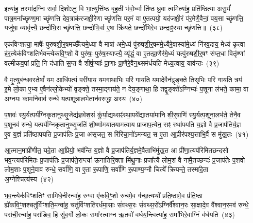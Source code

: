 इत्या॑ह॒ तस्मा॑द॒ग्निः सर्वा॒ दिशो\-ऽनु॒ वि भा॒त्युत्ति॑ष्ठ बृह॒ती भ॑वो॒र्ध्वा ति॑ष्ठ ध्रु॒वा त्वमित्या॑ह॒ प्रति॑ष्ठित्या असु॒र्यं॑ पात्र॒\-मना᳚च्छृण्ण॒मा च्छृ॑णत्ति देव॒त्राक॑रजक्षी॒रेणा च्छृ॑णत्ति पर॒मं वा ए॒तत्पयो॒ यद॑जक्षी॒रं प॑र॒मेणै॒वैनां॒ पय॒सा च्छृ॑णत्ति॒ यजु॑षा॒ व्यावृ॑त्त्यै॒ छन्दो॑भि॒रा च्छृ॑णत्ति॒ छन्दो॑भि॒र्वा ए॒षा क्रि॑यते॒ छन्दो॑भिरे॒व छन्दा॒ꣴ॒स्या च्छृ॑णत्ति॥~(३८)

{\anuvakamend[{आ॒ह॒ दे॒वानां॒ वै पत्नीः᳚ पृणै॒षा षट्च॑}]}%

एक॑विꣳशत्या॒ माषैः᳚ पुरुषशी॒र्॒\mbox{}षमच्छै᳚त्यमे॒ध्या वै माषा॑ अमे॒ध्यं पु॑रुषशी॒र्॒\mbox{}षम॑मे॒ध्यैरे॒वास्या॑मे॒ध्यं नि॑रव॒दाय॒ मेध्यं॑ कृ॒त्वा ह॑र॒त्येक॑विꣳशतिर्भवन्त्येकवि॒ꣳ॒शो वै पुरु॑षः॒ पुरु॑ष॒स्याप्त्यै॒ व्यृ॑द्धं॒ वा ए॒तत्प्रा॒णैर॑मे॒ध्यं यत्पु॑रुषशी॒र्॒\mbox{}षꣳ स॑प्त॒धा वितृ॑ण्णां वल्मीकव॒पां प्रति॒ नि द॑धाति स॒प्त वै शी॑र्\mbox{}ष॒ण्याः᳚ प्रा॒णाः प्रा॒णैरे॒वैन॒थ्सम॑र्धयति मेध्य॒त्वाय॒ याव॑न्तः~(३९)

वै मृ॒त्युब॑न्धव॒स्तेषां᳚ य॒म आधि॑पत्यं॒ परी॑याय यमगा॒थाभिः॒ परि॑ गायति य॒मादे॒वैन॑द्वृङ्क्ते ति॒सृभिः॒ परि॑ गायति॒ त्रय॑ इ॒मे लो॒का ए॒भ्य ए॒वैन॑ल्लो॒केभ्यो॑ वृङ्क्ते॒ तस्मा॒द्गाय॑ते॒ न देय॒ङ्गाथा॒ हि तद्वृ॒ङ्क्ते᳚\-ऽग्निभ्यः॑ प॒शूना ल॑भते॒ कामा॒ वा अ॒ग्नयः॒ कामा॑ने॒वाव॑ रुन्धे॒ यत्प॒शून्नालभे॒तान॑वरुद्धा अस्य~(४०)

प॒शवः॑ स्यु॒र्यत्पर्य॑ग्निकृतानुथ्सृ॒जेद्य॑ज्ञवेश॒सं कु॑र्या॒द्यथ्सꣴ॑स्था॒पये᳚द्या॒तया॑मानि शी॒र्॒\mbox{}षाणि॑ स्यु॒र्यत्प॒शूना॒लभ॑ते॒ तेनै॒व प॒शूनव॑ रुन्धे॒ यत्पर्य॑ग्निकृतानुथ्सृ॒जति॑ शी॒र्ष्णामया॑तयामत्वाय प्राजाप॒त्येन॒ सꣴ स्था॑पयति य॒ज्ञो वै प्र॒जा\-प॑तिर्य॒ज्ञ ए॒व य॒ज्ञं प्रति॑\-ष्ठापयति प्र॒जा\-प॑तिः प्र॒जा अ॑सृजत॒ स रि॑रिचा॒नो॑\-ऽमन्यत॒ स ए॒ता आ॒प्रीर॑पश्य॒त्ताभि॒र्वै स मु॑ख॒तः~(४१)

आ॒त्मान॒माप्री॑णीत॒ यदे॒ता आ॒प्रियो॒ भव॑न्ति य॒ज्ञो वै प्र॒जा\-प॑तिर्य॒ज्ञमे॒वैताभि॑र्मुख॒त आ प्री॑णा॒त्यप॑रिमितछन्दसो भव॒न्त्यप॑रिमितः प्र॒जा\-प॑तिः प्र॒जा\-प॑ते॒राप्त्या॑ ऊनातिरि॒क्ता मि॑थु॒नाः प्रजा᳚त्यै लोम॒शं वै नामै॒तच्छन्दः॑ प्र॒जा\-प॑तेः प॒शवो॑ लोम॒शाः प॒शूने॒वाव॑ रुन्धे॒ सर्वा॑णि॒ वा ए॒ता रू॒पाणि॒ सर्वा॑णि रू॒पाण्य॒ग्नौ चित्ये᳚ क्रियन्ते॒ तस्मा॑दे॒ता अ॒ग्नेश्चित्य॑स्य~(४२)

भ॒व॒न्त्येक॑विꣳशतिꣳ सामिधे॒नीरन्वा॑ह॒ रुग्वा ए॑कवि॒ꣳ॒शो रुच॑मे॒व ग॑च्छ॒त्यथो᳚ प्रति॒ष्ठामे॒व प्र॑ति॒ष्ठा ह्ये॑कवि॒ꣳ॒शश्चतु॑र्विꣳशति॒मन्वा॑ह॒ चतु॑र्विꣳशतिरर्धमा॒साः सं॑वथ्स॒रः सं॑वथ्स॒रो᳚\-ऽग्निर्वै᳚श्वान॒रः सा॒क्षादे॒व वै᳚श्वान॒रमव॑ रुन्धे॒ परा॑ची॒रन्वा॑ह॒ परा॑ङिव॒ हि सु॑व॒र्गो लो॒कः समा᳚स्त्वाग्न ऋ॒तवो॑ वर्धय॒न्त्वित्या॑ह॒ समा॑भिरे॒वाग्निं व॑र्धयति~(४३)

